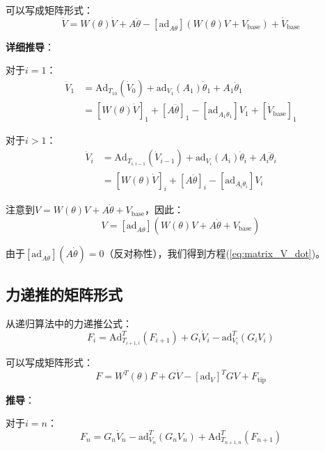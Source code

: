 \documentclass[12pt,a4paper]{article}
\begin{document}
可以写成矩阵形式：
\begin{equation}
\dot{V} = W(\theta)\dot{V} + A\ddot{\theta} - [\text{ad}_{A\dot{\theta}}](W(\theta)V + V_{\text{base}}) + \dot{V}_{\text{base}}
\label{eq:matrix_V_dot}
\end{equation}

\textbf{详细推导}：

对于$i = 1$：
\begin{align}
\dot{V}_1 &= \text{Ad}_{T_{10}}(\dot{V}_0) + \text{ad}_{V_1}(A_1)\dot{\theta}_1 + A_1 \ddot{\theta}_1 \\
&= [W(\theta)\dot{V}]_1 + [A\ddot{\theta}]_1 - [\text{ad}_{A_1\dot{\theta}_1}]V_1 + [\dot{V}_{\text{base}}]_1
\end{align}

对于$i > 1$：
\begin{align}
\dot{V}_i &= \text{Ad}_{T_{i,i-1}}(\dot{V}_{i-1}) + \text{ad}_{V_i}(A_i)\dot{\theta}_i + A_i \ddot{\theta}_i \\
&= [W(\theta)\dot{V}]_i + [A\ddot{\theta}]_i - [\text{ad}_{A_i\dot{\theta}_i}]V_i
\end{align}

注意到$V = W(\theta)V + A\dot{\theta} + V_{\text{base}}$，因此：
\begin{equation}
[\text{ad}_{A\dot{\theta}}]V = [\text{ad}_{A\dot{\theta}}](W(\theta)V + A\dot{\theta} + V_{\text{base}})
\end{equation}

由于$[\text{ad}_{A\dot{\theta}}](A\dot{\theta}) = 0$（反对称性），我们得到方程(\ref{eq:matrix_V_dot})。

\subsection{力递推的矩阵形式}

从递归算法中的力递推公式：
\begin{equation}
F_i = \text{Ad}_{T_{i+1,i}}^T(F_{i+1}) + G_i \dot{V}_i - \text{ad}_{V_i}^T(G_i V_i)
\end{equation}

可以写成矩阵形式：
\begin{equation}
F = W^T(\theta)F + G\dot{V} - [\text{ad}_V]^T GV + F_{\text{tip}}
\label{eq:matrix_F}
\end{equation}

\textbf{推导}：

对于$i = n$：
\begin{equation}
F_n = G_n \dot{V}_n - \text{ad}_{V_n}^T(G_n V_n) + \text{Ad}_{T_{n+1,n}}^T(F_{n+1})
\end{equation}
\end{document}
